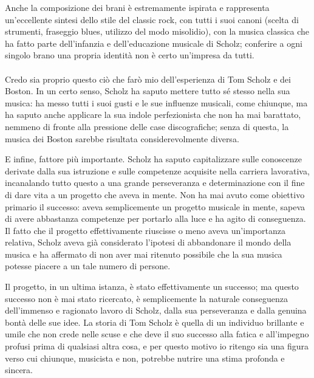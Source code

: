 \documentclass[class=book, crop=false, oneside, 12pt]{standalone}
\begin{document}
Anche la composizione dei brani è estremamente ispirata e rappresenta un'eccellente sintesi dello stile del classic rock, con tutti i suoi canoni (scelta di strumenti, fraseggio blues, utilizzo del modo misolidio), con la musica classica che ha fatto parte dell'infanzia e dell'educazione musicale di Scholz; conferire a ogni singolo brano una propria identità non è certo un'impresa da tutti.

\paragraph{}
Credo sia proprio questo ciò che farò mio dell'esperienza di Tom Scholz e dei Boston. In un certo senso, Scholz ha saputo mettere tutto sé stesso nella sua musica: ha messo tutti i suoi gusti e le sue influenze musicali, come chiunque, ma ha saputo anche applicare la sua indole perfezionista che non ha mai barattato, nemmeno di fronte alla pressione delle case discografiche; senza di questa, la musica dei Boston sarebbe risultata considerevolmente diversa.

E infine, fattore più importante. Scholz ha saputo capitalizzare sulle conoscenze derivate dalla sua istruzione e sulle competenze acquisite nella carriera lavorativa, incanalando tutto questo a una grande perseveranza e determinazione con il fine di dare vita a un progetto che aveva in mente. Non ha mai avuto come obiettivo primario il successo: aveva semplicemente un progetto musicale in mente, sapeva di avere abbastanza competenze per portarlo alla luce e ha agito di conseguenza. Il fatto che il progetto effettivamente riuscisse o meno aveva un'importanza relativa, Scholz aveva già considerato l'ipotesi di abbandonare il mondo della musica e ha affermato di non aver mai ritenuto possibile che la sua musica potesse piacere a un tale numero di persone.

Il progetto, in un ultima istanza, è stato effettivamente un successo; ma questo successo non è mai stato ricercato, è semplicemente la naturale conseguenza dell'immenso e ragionato lavoro di Scholz, dalla sua perseveranza e dalla genuina bontà delle sue idee. La storia di Tom Scholz è quella di un individuo brillante e umile che non crede nelle scuse e che deve il suo successo alla fatica e all'impegno profusi prima di qualsiasi altra cosa, e per questo motivo io ritengo sia una figura verso cui chiunque, musicista e non, potrebbe nutrire una stima profonda e sincera. 
\end{document}
